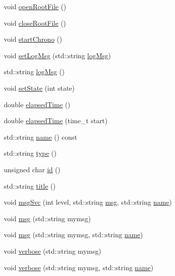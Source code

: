 \begin{DoxyCompactItemize}
\item 
void \hyperlink{classProcessus_aacf6812880c1d1a2bf14a4a39458f443}{open\+Root\+File} ()
\item 
void \hyperlink{classProcessus_a2f3c41e99da4c738ea3d8f7b0d20a665}{close\+Root\+File} ()
\item 
void \hyperlink{classProcessus_a5e4d34b86241fa0756e07375a14ff4b2}{start\+Chrono} ()
\item 
void \hyperlink{classProcessus_a471833f89047aa9a7ff6200a31c17a1d}{set\+Log\+Msg} (std\+::string \hyperlink{classProcessus_a42fdeb17dc13ba854222666b6aa29b61}{log\+Msg})
\item 
std\+::string \hyperlink{classProcessus_a42fdeb17dc13ba854222666b6aa29b61}{log\+Msg} ()
\item 
void \hyperlink{classProcessus_ad38cde0f1bcefa00b068e7947b8af927}{set\+State} (int state)
\item 
double \hyperlink{classProcessus_aecca96218c65bc805c988cd95447df55}{elapsed\+Time} ()
\item 
double \hyperlink{classProcessus_a06d3815ad56593dfd0d3c1f534f8b146}{elapsed\+Time} (time\+\_\+t start)
\item 
std\+::string \hyperlink{classObject_a300f4c05dd468c7bb8b3c968868443c1}{name} () const
\item 
std\+::string \hyperlink{classObject_a84f99f70f144a83e1582d1d0f84e4e62}{type} ()
\item 
unsigned char \hyperlink{classObject_af99145335cc61ff6e2798ea17db009d2}{id} ()
\item 
std\+::string \hyperlink{classObject_a73a0f1a41828fdd8303dd662446fb6c3}{title} ()
\item 
void \hyperlink{classObject_a3f9d5537ebce0c0f2bf6ae4d92426f3c}{msg\+Svc} (int level, std\+::string \hyperlink{classObject_a58b2d0618c2d08cf2383012611528d97}{msg}, std\+::string \hyperlink{classObject_a300f4c05dd468c7bb8b3c968868443c1}{name})
\item 
void \hyperlink{classObject_a58b2d0618c2d08cf2383012611528d97}{msg} (std\+::string mymsg)
\item 
void \hyperlink{classObject_ac5d59299273cee27aacf7de00d2e7034}{msg} (std\+::string mymsg, std\+::string \hyperlink{classObject_a300f4c05dd468c7bb8b3c968868443c1}{name})
\item 
void \hyperlink{classObject_a83d2db2df682907ea1115ad721c1c4a1}{verbose} (std\+::string mymsg)
\item 
void \hyperlink{classObject_a2d4120195317e2a3c6532e8bb9f3da68}{verbose} (std\+::string mymsg, std\+::string \hyperlink{classObject_a300f4c05dd468c7bb8b3c968868443c1}{name})

\end{DoxyCompactItemize}

